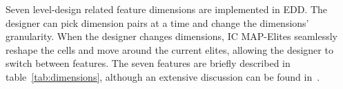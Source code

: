 
Seven level-design related feature dimensions are implemented in EDD. The designer can pick dimension pairs at a time and change the dimensions' granularity. When the designer changes dimensions, IC MAP-Elites seamlessly reshape the cells and move around the current elites, allowing the designer to switch between features. The seven features are briefly described in table~\ref{tab:dimensions}, although an extensive discussion can be found in~. 





